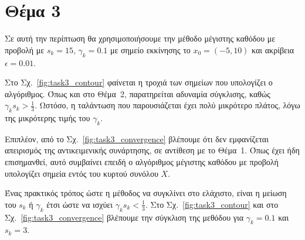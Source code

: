 \documentclass[a4paper,12pt]{article}
\begin{document}
\section*{Θέμα 3}
Σε αυτή την περίπτωση θα χρησιμοποιήσουμε την μέθοδο μέγιστης καθόδου με προβολή με $s_k = 15$, $\gamma_k = 0.1$
με σημείο εκκίνησης το $x_0 = (-5, 10)$ και ακρίβεια $\epsilon = 0.01$.

Στο Σχ.~\ref{fig:task3_contour} φαίνεται η τροχιά των σημείων που υπολογίζει ο αλγόριθμος. Όπως και στο Θέμα~2, 
παρατηρείται αδυναμία σύγκλισης, καθώς $\gamma_k s_k > \frac{1}{3}$. Ωστόσο, η ταλάντωση που παρουσιάζεται 
έχει πολύ μικρότερο πλάτος, λόγω της μικρότερης τιμής του $\gamma_k$. 

Επιπλέον, από το Σχ.~\ref{fig:task3_convergence} βλέπουμε ότι δεν εμφανίζεται απειρισμός της αντικειμενικής συνάρτησης, 
σε αντίθεση με το Θέμα~1. Όπως έχει ήδη επισημανθεί, αυτό συμβαίνει επειδή ο αλγόριθμος μέγιστης καθόδου με προβολή 
υπολογίζει σημεία εντός του κυρτού συνόλου $X$.

Ένας πρακτικός τρόπος ώστε η μέθοδος να συγκλίνει στο ελάχιστο, είναι η μείωση του $s_k$ ή $\gamma_k$ έτσι ώστε
να ισχύει $\gamma_k s_k < \frac{1}{3}$. Στο Σχ.~\ref{fig:task3_contour} και στο Σχ.~\ref{fig:task3_convergence} 
βλέπουμε την σύγκλιση της μεθόδου για $\gamma_k = 0.1$ και $s_k = 3$.
\end{document}
